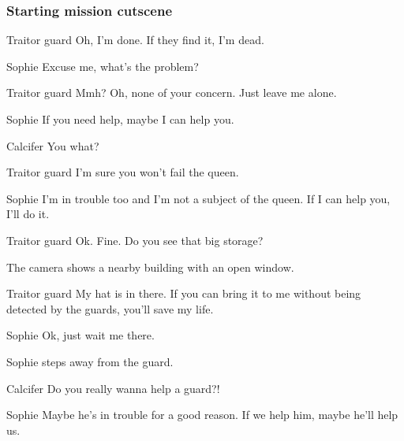 \subsubsection*{Starting mission cutscene}
\begin{screenplay}

\begin{dialogue}[forlorn]{Traitor guard}
Oh, I'm done. If they find it, I'm dead.
\end{dialogue}

\begin{dialogue}{Sophie}
Excuse me, what's the problem?
\end{dialogue}

\begin{dialogue}[forlorn]{Traitor guard}
Mmh? Oh, none of your concern. Just leave me alone.
\end{dialogue}

\begin{dialogue}{Sophie}
If you need help, maybe I can help you.
\end{dialogue}

\begin{dialogue}[surprised]{Calcifer}
You what?
\end{dialogue}

\begin{dialogue}[forlorn]{Traitor guard}
I'm sure you won't fail the queen.
\end{dialogue}

\begin{dialogue}{Sophie}
I'm in trouble too and I'm not a subject of the queen. If I can help you, I'll do it.
\end{dialogue}

\begin{dialogue}[weird]{Traitor guard}
Ok. Fine. Do you see that big storage?
\end{dialogue}

The camera shows a nearby building with an open window.

\begin{dialogue}[continuing]{Traitor guard}
My hat is in there. If you can bring it to me without being detected by the guards, you'll save my life.
\end{dialogue}

\begin{dialogue}{Sophie}
Ok, just wait me there.
\end{dialogue}

Sophie steps away from the guard.

\begin{dialogue}[disappointed]{Calcifer}
Do you really wanna help a guard?!
\end{dialogue}

\begin{dialogue}{Sophie}
Maybe he's in trouble for a good reason. If we help him, maybe he'll help us.
\end{dialogue}

\end{screenplay}

